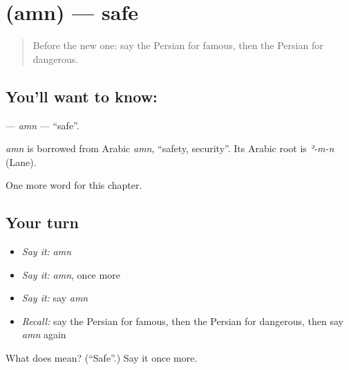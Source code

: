 \section[\texorpdfstring{\fa{امن} (amn)}{امن (amn)}]{ (amn) — safe}

\label{lesson:FA-C126-amn}



\begin{quote}
Before the new one: say the Persian for famous, then the Persian for dangerous.
\end{quote}

\subsection*{You'll want to know: }
\textbf{} — \emph{amn} — \textquotedblleft{}safe\textquotedblright{}.

\begin{cousinweb}
\emph{amn} is borrowed from Arabic \emph{amn}, \textquotedblleft{}safety, security\textquotedblright{}. Its Arabic root is \emph{ʾ-m-n} (Lane).
\end{cousinweb}

\begin{grammarlens}[title={What you've built}]
One more word for this chapter.
\end{grammarlens}

\subsection*{Your turn}
\begin{itemize}
\raggedright
  \item \emph{Say it:} \emph{amn}
  \item \emph{Say it:} \emph{amn}, once more
  \item \emph{Say it:} say \emph{amn}
  \item \emph{Recall:} say the Persian for famous, then the Persian for dangerous, then say \emph{amn} again
\end{itemize}

\begin{tcolorbox}[breakable,colback=teal!4,colframe=teal!35!black,title={Before you move on}]
What does  mean? (\textquotedblleft{}Safe\textquotedblright{}.) Say it once more.
\end{tcolorbox}
